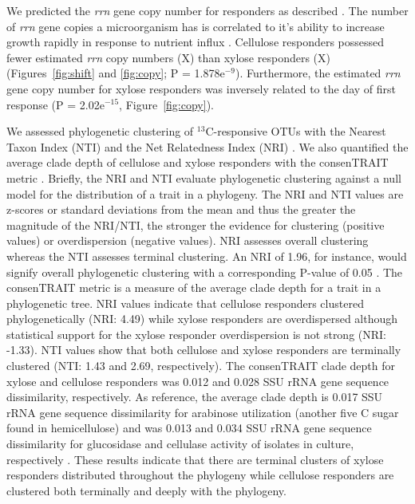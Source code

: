 We predicted the \textit{rrn} gene copy number for responders as described
\citep{Kembel_2012}. The number of \textit{rrn} gene copies
a microorganism has is correlated to it's ability to increase growth
rapidly in response to nutrient influx \citep{Klappenbach_2000}. Cellulose
responders possessed fewer estimated \textit{rrn} copy numbers (X) than xylose
responders (X) (Figures~\ref{fig:shift} and \ref{fig:copy};
P = 1.878e$^{-9}$). Furthermore, the estimated \textit{rrn} gene copy
number for xylose responders was inversely related to the day of first
response (P = 2.02e$^{-15}$, Figure~\ref{fig:copy}).

We assessed phylogenetic clustering of $^{13}$C-responsive OTUs with the
Nearest Taxon Index (NTI) and the Net Relatedness Index (NRI)
\citep{Webb2000}. We also quantified the average clade depth of cellulose and
xylose responders with the consenTRAIT metric \citep{Martiny2013}. Briefly, the
NRI and NTI evaluate phylogenetic clustering against a null model for the
distribution of a trait in a phylogeny. The NRI and NTI values are z-scores or
standard deviations from the mean and thus the greater the magnitude of the
NRI/NTI, the stronger the evidence for clustering (positive values) or
overdispersion (negative values). NRI assesses overall clustering whereas the
NTI assesses terminal clustering. An NRI of 1.96, for instance, would signify
overall phylogenetic clustering with a corresponding P-value of 0.05
\citep{Evans2014a}. The consenTRAIT metric is a measure of the average clade
depth for a trait in a phylogenetic tree. NRI values indicate that cellulose
responders clustered phylogenetically (NRI: 4.49) while xylose responders are
overdispersed although statistical support for the xylose responder
overdispersion is not strong (NRI: -1.33). NTI values show that both cellulose
and xylose responders are terminally clustered (NTI: 1.43 and 2.69,
respectively). The consenTRAIT clade depth for xylose and cellulose responders
was 0.012 and 0.028 SSU rRNA gene sequence dissimilarity, respectively. As
reference, the average clade depth is 0.017 SSU rRNA gene sequence
dissimilarity for arabinose utilization (another five C sugar found in
hemicellulose) and was 0.013 and 0.034 SSU rRNA gene sequence dissimilarity for
glucosidase and cellulase activity of isolates in culture, respectively
\citep{Martiny2013,Berlemont2013}. These results indicate that there are
terminal clusters of xylose responders distributed throughout the phylogeny
while cellulose responders are clustered both terminally and deeply with the
phylogeny.
